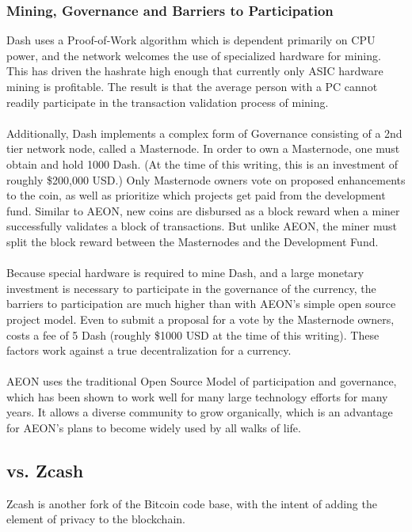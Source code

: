 \subsubsection{Mining, Governance and Barriers to Participation}
Dash uses a Proof-of-Work algorithm which is dependent primarily on CPU power, and the network welcomes the use of specialized hardware for mining. This has driven the hashrate high enough that currently only ASIC hardware mining is profitable.  The result is that the average person with a PC cannot readily participate in the transaction validation process of mining.\\
\\
Additionally, Dash implements a complex form of Governance consisting of a 2nd tier network node, called a Masternode. In order to own a Masternode, one must obtain and hold 1000 Dash.  (At the time of this writing, this is an investment of roughly \$200,000 USD.)  Only Masternode owners vote on proposed enhancements to the coin, as well as prioritize which projects get paid from the development fund.  Similar to AEON, new coins are disbursed as a block reward when a miner successfully validates a block of transactions.  But unlike AEON, the miner must split the block reward between the Masternodes and the Development Fund.\\
\\
Because special hardware is required to mine Dash, and a large monetary investment is necessary to participate in the governance of the currency, the barriers to participation are much higher than with AEON's simple open source project model.  Even to submit a proposal for a vote by the Masternode owners, costs a fee of 5 Dash (roughly \$1000 USD at the time of this writing).  These factors work against a true decentralization for a currency.\\
\\
AEON uses the traditional Open Source Model of participation and governance, which has been shown to work well for many large technology efforts for many years. It allows a diverse community to grow organically, which is an advantage for AEON's plans to become widely used by all walks of life.

\subsection{vs. Zcash}
Zcash is another fork of the Bitcoin code base, with the intent of adding the element of privacy to the blockchain.

